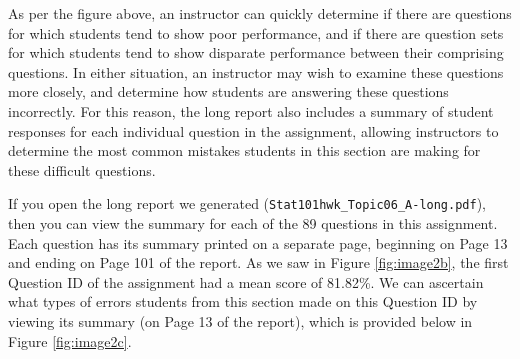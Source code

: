 \documentclass{article}\usepackage[]{graphicx}\usepackage[]{color}
\numberwithin{equation}{section} %
\begin{document}
\begin{center}
\captionsetup{width=\textwidth}
\label{fig:image2b}
\end{center}

As per the figure above, an instructor can quickly determine if there are questions for which students tend to show poor performance, and if there are question sets for which students tend to show disparate performance between their comprising questions. In either situation, an instructor may wish to examine these questions more closely, and determine how students are answering these questions incorrectly. For this reason, the long report also includes a summary of student responses for each individual question in the assignment, allowing instructors to determine the most common mistakes students in this section are making for these difficult questions.

If you open the long report we generated (\texttt{Stat101hwk\_Topic06\_A-long.pdf}), then you can view the summary for each of the 89 questions in this assignment. Each question has its summary printed on a separate page, beginning on Page 13 and ending on Page 101 of the report. As we saw in Figure \ref{fig:image2b}, the first Question ID of the assignment had a mean score of 81.82\%. We can ascertain what types of errors students from this section made on this Question ID by viewing its summary (on Page 13 of the report), which is provided below in Figure \ref{fig:image2c}. 
\end{document}
